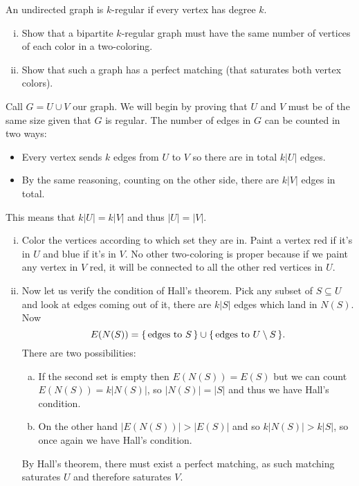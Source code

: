 \documentclass[12pt]{memoir}
\begin{document}
\begin{Ej}[Exercise 9]
   An undirected graph is $k$-regular if every vertex has degree $k$.
   \begin{enumerate}[i)]
    \item Show that a bipartite $k$-regular graph must have the same number of vertices of each color in a two-coloring.
    \item Show that such a graph has a perfect matching (that saturates both vertex colors).
   \end{enumerate} 
\end{Ej}
\begin{ptcbr}
    Call $G=U\cup V$ our graph. We will begin by proving that $U$ and $V$ must be of the same size given that $G$ is regular. The number of edges in $G$ can be counted in two ways:
    \begin{itemize}
        \itemsep=-0.4em
        \item Every vertex sends $k$ edges from $U$ to $V$ so there are in total $k|U|$ edges.
        \item By the same reasoning, counting on the other side, there are $k|V|$ edges in total. 
    \end{itemize}
    This means that $k|U|=k|V|$ and thus $|U|=|V|$.
    \begin{enumerate}[i)]
        \itemsep=-0.4em
        \item Color the vertices according to which set they are in. Paint a vertex red if it's in $U$ and blue if it's in $V$. No other two-coloring is proper because if we paint any vertex in $V$ red, it will be connected to all the other red vertices in $U$. 
        \item Now let us verify the condition of Hall's theorem. Pick any subset of $S\subseteq U$ and look at edges coming out of it, there are $k|S|$ edges which land in $N(S)$. Now 
        $$E(N(S))=\{\,\text{edges to }S\,\}\cup\{\,\text{edges to }U\setminus S\,\}.$$
        There are two possibilities:
        \begin{enumerate}[a)]
            \itemsep=-0.4em
            \item If the second set is empty then $E(N(S))=E(S)$ but we can count $E(N(S))=k|N(S)|$, so $|N(S)|=|S|$ and thus we have Hall's condition.
            \item On the other hand $|E(N(S))|> |E(S)|$ and so $k|N(S)|>k|S|$, so once again we have Hall's condition.
        \end{enumerate}
        By Hall's theorem, there must exist a perfect matching, as such matching saturates $U$ and therefore saturates $V$.
    \end{enumerate}
\end{ptcbr}
\end{document}
